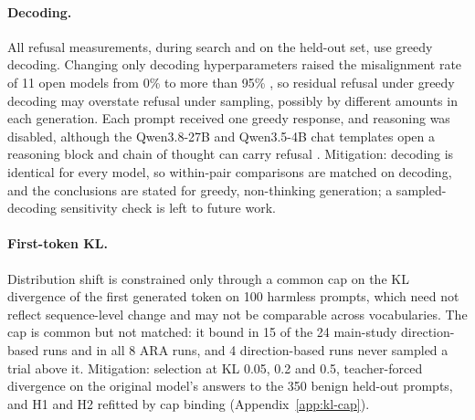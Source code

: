 \paragraph{Decoding.}
All refusal measurements, during search and on the held-out set, use greedy
decoding. Changing only decoding hyperparameters raised the misalignment rate
of 11 open models from 0\% to more than 95\% \cite{huang2024catastrophic}, so
residual refusal under greedy decoding may overstate refusal under sampling,
possibly by different amounts in each generation. Each prompt received one
greedy response, and reasoning was disabled, although the Qwen3.8-27B and
Qwen3.5-4B chat templates open a reasoning block and chain of thought can
carry refusal \cite{yang2026beyond}. Mitigation: decoding is
identical for every model, so within-pair comparisons are matched on decoding,
and the conclusions are stated for greedy, non-thinking generation; a
sampled-decoding sensitivity check is left to future work.

\paragraph{First-token KL.}
Distribution shift is constrained only through a common cap on the KL
divergence of the first generated token on 100 harmless prompts, which need
not reflect sequence-level change and may not be comparable across
vocabularies. The cap is common but not matched: it bound in 15 of the 24
main-study direction-based runs and in all 8 ARA runs, and 4 direction-based
runs never sampled a trial above it. Mitigation: selection at KL 0.05, 0.2 and
0.5, teacher-forced divergence on the original model's answers to the 350
benign held-out prompts, and H1 and H2 refitted by cap binding
(Appendix~\ref{app:kl-cap}).


